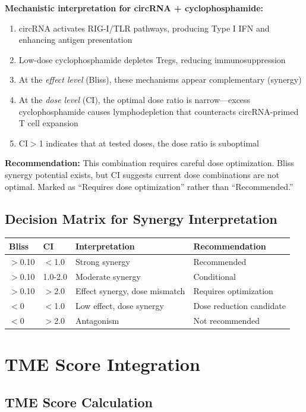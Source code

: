 \documentclass{article}
\begin{document}
\textbf{Mechanistic interpretation for circRNA + cyclophosphamide:}
\begin{enumerate}
\item circRNA activates RIG-I/TLR pathways, producing Type I IFN and enhancing antigen presentation
\item Low-dose cyclophosphamide depletes Tregs, reducing immunosuppression
\item At the \textit{effect level} (Bliss), these mechanisms appear complementary (synergy)
\item At the \textit{dose level} (CI), the optimal dose ratio is narrow---excess cyclophosphamide causes lymphodepletion that counteracts circRNA-primed T cell expansion
\item CI$>$1 indicates that at tested doses, the dose ratio is suboptimal
\end{enumerate}

\textbf{Recommendation:} This combination requires careful dose optimization. Bliss synergy potential exists, but CI suggests current dose combinations are not optimal. Marked as ``Requires dose optimization'' rather than ``Recommended.''

\subsection{Decision Matrix for Synergy Interpretation}

\begin{longtable}{llll}
\toprule
Bliss & CI & Interpretation & Recommendation \\
\midrule
$>$0.10 & $<$1.0 & Strong synergy & Recommended \\
$>$0.10 & 1.0-2.0 & Moderate synergy & Conditional \\
$>$0.10 & $>$2.0 & Effect synergy, dose mismatch & Requires optimization \\
$<$0 & $<$1.0 & Low effect, dose synergy & Dose reduction candidate \\
$<$0 & $>$2.0 & Antagonism & Not recommended \\
\bottomrule
\end{longtable}

\section{TME Score Integration}

\subsection{TME Score Calculation}
\end{document}
